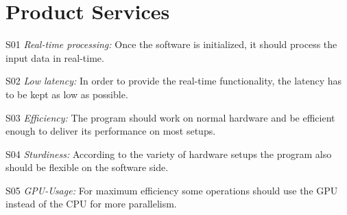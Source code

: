 \section{Product Services}

\begin{aims}
	\item[S01] \textit{Real-time processing:} Once the software is initialized, it should process the input data in real-time.
	
	\item[S02] \textit{Low latency:} In order to provide the real-time functionality, the latency has to be kept as low as possible.
	
	\item[S03] \textit{Efficiency:} The program should work on normal hardware and be efficient enough to deliver its performance on most setups. 
	
	\item[S04] \textit{Sturdiness:} According to the variety of hardware setups the program also should be flexible on the software side.
	
	\item[S05] \textit{GPU-Usage:} For maximum efficiency some operations should use the GPU instead of the CPU for more parallelism. 
\end{aims}